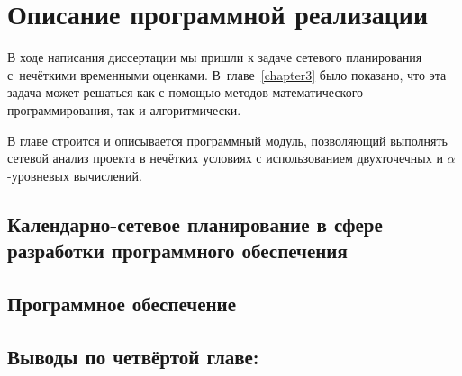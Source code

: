 \chapter{Описание программной реализации}
\label{chapter4}

В ходе написания диссертации мы пришли к задаче сетевого планирования с~нечёткими временными оценками. В~главе~\ref{chapter3} было показано, что эта задача может решаться как с помощью методов математического программирования, так и алгоритмически.

В главе строится и описывается программный модуль, позволяющий выполнять сетевой анализ проекта в нечётких условиях с использованием двухточечных и $\alpha$-уровневых вычислений.

\newpage
\section{Календарно-сетевое планирование в сфере разработки программного обеспечения} 
\label{chapter4_1}


\section{Программное обеспечение} 
\label{chapter4_2}


\newpage
\section*{Выводы по четвёртой главе:} 
\label{chapter4_3}
